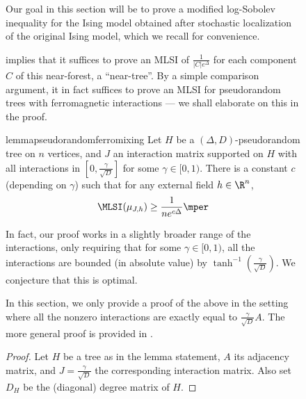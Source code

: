 \documentclass[11pt,letterpaper]{article}
\begin{document}
\begin{figure}
    Our goal in this section will be to prove a modified log-Sobolev inequality for the Ising model obtained after stochastic localization of the original Ising model, which we recall for convenience.

    \mlsitree*

     implies that it suffices to prove an MLSI of $\frac{1}{|C| e^{\Delta}}$ for each component $C$ of this near-forest, a ``near-tree''. By a simple comparison argument, it in fact suffices to prove an MLSI for pseudorandom trees with ferromagnetic interactions --- we shall elaborate on this in the proof.

    \begin{restatable}{lemma}{pseudorandomferromixing}
        \label{lem:pseudorandom-ferro-mixing}
         Let $H$ be a $(\Delta,D)$-pseudorandom tree on $n$ vertices, and $J$ an interaction matrix supported on $H$ with all interactions in $\left[0, \frac{\gamma}{\sqrt{D}}\right]$ for some $\gamma \in [0,1)$.
        There is a constant $c$ (depending on $\gamma$) such that for any external field $h \in \R^n$,
        \[ \MLSI(\mu_{J,h}) \ge \frac{1}{ne^{c\Delta}}\mper \]
    \end{restatable}
    
    \begin{remark}
        In fact, our proof works in a slightly broader range of the interactions, only requiring that for some $\gamma \in [0,1)$, all the interactions are bounded (in absolute value) by $\tanh^{-1} \left( \frac{\gamma}{\sqrt{D}} \right)$. We conjecture that this is optimal. 
    \end{remark}
    
    In this section, we only provide a proof of the above in the setting where all the nonzero interactions are exactly equal to $\frac{\gamma}{\sqrt{D}}A$. The more general proof is provided in .
    
    \begin{proof}
        Let $H$ be a tree as in the lemma statement, $A$ its adjacency matrix, and $J = \frac{\gamma}{\sqrt{D}}$ the corresponding interaction matrix. Also set $D_H$ be the (diagonal) degree matrix of $H$.


\end{proof}
\end{figure}
\end{document}
